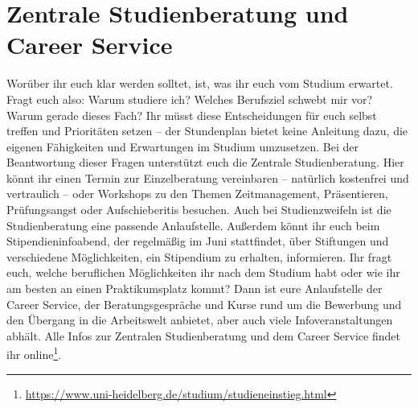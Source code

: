 \section[Zentrale Studienberatung und Career Service]{Zentrale Studienberatung und \\Career Service}
Worüber ihr euch klar werden solltet, ist, was ihr euch vom Studium erwartet. Fragt euch also: Warum studiere ich? Welches Berufsziel schwebt mir vor? Warum gerade dieses Fach? Ihr müsst diese Entscheidungen für euch selbst treffen und Prioritäten setzen -- der Stundenplan bietet keine Anleitung dazu, die eigenen Fähigkeiten und Erwartungen im Studium umzusetzen. Bei der Beantwortung dieser Fragen unterstützt euch die Zentrale Studienberatung. Hier könnt ihr einen Termin zur Einzelberatung vereinbaren -- natürlich kostenfrei und vertraulich -- oder Workshops zu den Themen Zeitmanagement, Präsentieren, Prüfungsangst oder Aufschieberitis besuchen. Auch bei Studienzweifeln ist die Studienberatung eine passende Anlaufstelle. Außerdem könnt ihr euch beim Stipendieninfoabend, der regelmäßig im Juni stattfindet, über Stiftungen und verschiedene Möglichkeiten, ein Stipendium zu erhalten, informieren.
Ihr fragt euch, welche beruflichen Möglichkeiten ihr nach dem Studium habt oder wie ihr am besten an einen Praktikumsplatz kommt? Dann ist eure Anlaufstelle der Career Service, der Beratungsgespräche und Kurse rund um die Bewerbung und den Übergang in die Arbeitswelt anbietet, aber auch viele Infoveranstaltungen abhält. 
Alle Infos zur Zentralen Studienberatung und dem Career Service findet ihr online\footnote{\url{https://www.uni-heidelberg.de/studium/studieneinstieg.html}}.
